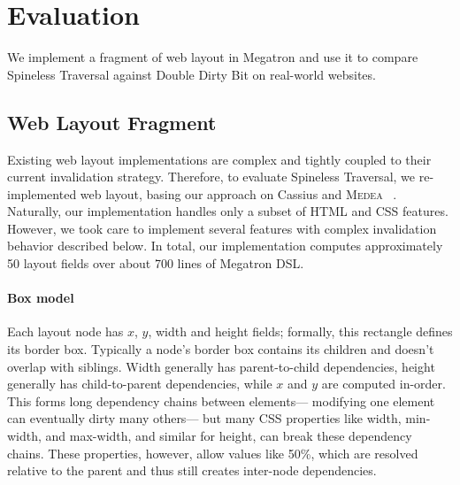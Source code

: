 \section{Evaluation}

We implement a fragment of web layout in Megatron
  and use it to compare Spineless Traversal
  against Double Dirty Bit
  on \NumWebsites real-world websites.

\subsection{Web Layout Fragment}
\label{sec:layout-impl}

Existing web layout implementations
  are complex and tightly coupled
  to their current invalidation strategy.
Therefore, to evaluate Spineless Traversal,
  we re-implemented web layout, 
  basing our approach on Cassius and \textsc{Medea}%
  ~\cite{cassius-1,cassius-2,yufeng-2}.
Naturally, our implementation handles only a subset
  of HTML and CSS features.
However, we took care to implement several features
  with complex invalidation behavior described below.
In total, our implementation computes approximately 50 layout fields
  over about 700 lines of Megatron DSL.

\paragraph{Box model}
Each layout node has $x$, $y$, \textsf{width} and \textsf{height} fields;
  formally, this rectangle defines its border box.
Typically a node's border box contains its children
  and doesn't overlap with siblings.
Width generally has parent-to-child dependencies,
  height generally has child-to-parent dependencies,
  while $x$ and $y$ are computed in-order.
This forms long dependency chains between elements---%
  modifying one element can eventually dirty many others---%
  but many CSS properties like
  \textsf{width}, \textsf{min-width}, and \textsf{max-width},
  and similar for \textsf{height},
  can break these dependency chains.
These properties, however, allow values like \textsf{50\%},
  which are resolved relative to the parent and thus
  still creates inter-node dependencies.
	
